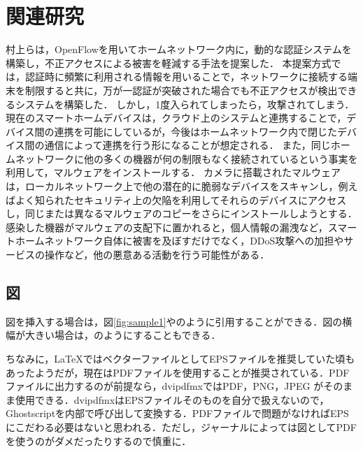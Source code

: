 \documentclass[a4paper,10pt,twocolumn,uplatex]{jsarticle}
\begin{document}
\section{関連研究}
村上らは，OpenFlowを用いてホームネットワーク内に，動的な認証システムを構築し，不正アクセスによる被害を軽減する手法を提案した．
本提案方式では，認証時に頻繁に利用される情報を用いることで，ネットワークに接続する端末を制限すると共に，万が一認証が突破された場合でも不正アクセスが検出できるシステムを構築した．
しかし，1度入られてしまったら，攻撃されてしまう．
現在のスマートホームデバイスは，クラウド上のシステムと連携することで，デバイス間の連携を可能にしているが，今後はホームネットワーク内で閉じたデバイス間の通信によって連携を行う形になることが想定される\cite{d2d}．
また，同じホームネットワークに他の多くの機器が何の制限もなく接続されているという事実を利用して，マルウェアをインストールする．
カメラに搭載されたマルウェアは，ローカルネットワーク上で他の潜在的に脆弱なデバイスをスキャンし，例えばよく知られたセキュリティ上の欠陥を利用してそれらのデバイスにアクセスし，同じまたは異なるマルウェアのコピーをさらにインストールしようとする．
感染した機器がマルウェアの支配下に置かれると，個人情報の漏洩など，スマートホームネットワーク自体に被害を及ぼすだけでなく，DDoS攻撃への加担やサービスの操作など，他の悪意ある活動を行う可能性がある\cite{disap}．

\subsection{図}
図を挿入する場合は，図\ref{fig:sample1}やのように引用することができる．図の横幅が大きい場合は，のようにすることもできる．\par
ちなみに，\LaTeX{}ではベクターファイルとしてEPSファイルを推奨していた頃もあったようだが，現在はPDFファイルを使用することが推奨されている．PDFファイルに出力するのが前提なら，dvipdfmxではPDF，PNG，JPEG がそのまま使用できる．dvipdfmxはEPSファイルそのものを自分で扱えないので，Ghostscriptを内部で呼び出して変換する．PDFファイルで問題がなければEPSにこだわる必要はないと思われる．ただし，ジャーナルによっては図としてPDFを使うのがダメだったりするので慎重に．
\end{document}
